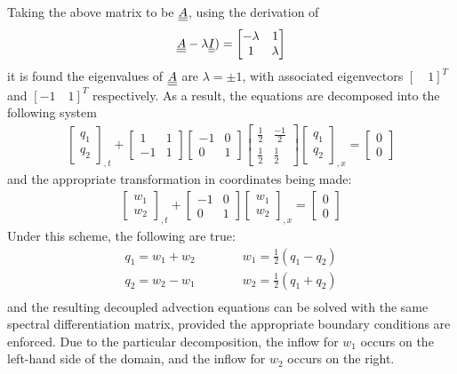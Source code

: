 Taking the above matrix to be ${\underline{\underline{A}}}$, using the derivation of 
\begin{align*}
	{\underline{\underline{A}}} - \lambda {\underline{\underline{I}}}) = 
	\begin{bmatrix}
		-\lambda & 1 \\
		1 & \lambda
	\end{bmatrix}
\end{align*}
it is found the eigenvalues of ${\underline{\underline{A}}}$ are $\lambda = \pm 1$, with associated eigenvectors $[\quad 1]^T$ and $[-1\quad1]^T$ respectively.
As a result, the equations are decomposed into the following system
\begin{align*}
	\begin{bmatrix}
		q_1\\
		q_2
	\end{bmatrix}_{,t} + 
	\begin{bmatrix}
		1 & 1 \\
		-1 & 1
	\end{bmatrix}	
	\begin{bmatrix}
		-1 & 0 \\
		0 & 1
	\end{bmatrix}
	\begin{bmatrix}
		\frac{1}{2} & \frac{-1}{2} \\
		\frac{1}{2} & \frac{1}{2}
	\end{bmatrix}
	\begin{bmatrix}
		q_1 \\
		q_2
	\end{bmatrix}_{,x} = 
	\begin{bmatrix}
		0 \\
		0
	\end{bmatrix}
\end{align*}
and the appropriate transformation in coordinates being made:
\begin{align*}
	\begin{bmatrix}
		w_1\\
		w_2
	\end{bmatrix}_{,t} + 
	\begin{bmatrix}
		-1 & 0 \\
		0 & 1
	\end{bmatrix}
	\begin{bmatrix}
		w_1 \\
		w_2
	\end{bmatrix}_{,x} = 
	\begin{bmatrix}
		0 \\
		0
	\end{bmatrix}
\end{align*}
Under this scheme, the following are true:
\begin{align*}
	q_1 = w_1 + w_2 \quad &\quad \quad w_1 = \frac{1}{2}(q_1 - q_2)\\
	q_2 = w_2 - w_1 \quad &\quad \quad w_2 = \frac{1}{2}(q_1 + q_2)\\
\end{align*}
and the resulting decoupled advection equations can be solved with the same spectral differentiation matrix, provided the appropriate boundary conditions are enforced.
Due to the particular decomposition, the inflow for $w_1$ occurs on the left-hand side of the domain, and the inflow for $w_2$ occurs on the right.

